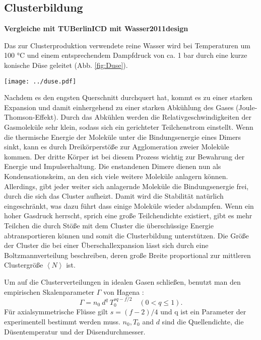 \subsection{Clusterbildung}

\textbf{Vergleiche mit TUBerlinICD mit Wasser2011design}

Das zur Clusterproduktion verwendete reine Wasser wird bei Temperaturen um 100 °C und einem entsprechendem Dampfdruck von ca. 1 bar durch eine kurze konische Düse geleitet (Abb. \ref{fig:Duse}).
%
\begin{center}
\begin{minipage}{\linewidth}
\centering
\texttt{[image: ../duse.pdf]}%
 \label{fig:Duse}
\end{minipage} 
\end{center} 

Nachdem es den engsten Querschnitt durchquert hat, kommt es zu einer starken Expansion und damit einhergehend zu einer starken Abkühlung des Gases (Joule-Thomson-Effekt). Durch das Abkühlen werden die Relativgeschwindigkeiten der Gasmoleküle sehr klein, sodass sich ein gerichteter Teilchenstrom einstellt. Wenn die thermische Energie der Moleküle unter die Bindungsenergie eines Dimers sinkt, kann es durch Dreikörperstöße zur Agglomeration zweier Moleküle kommen. Der dritte Körper ist bei diesem Prozess wichtig zur Bewahrung der Energie und Impulserhaltung. Die enstandenen Dimere dienen nun als Kondensationskeim, an den sich viele weitere Moleküle anlagern können. Allerdings, gibt jeder weiter sich anlagernde Moleküle die Bindungsenergie frei, durch die sich das Cluster aufheizt. Damit wird die Stabilität natürlich eingeschränkt, was dazu führt dass einige Moleküle wieder abdampfen. Wenn ein hoher Gasdruck herrscht, sprich eine große Teilchendichte existiert, gibt es mehr Teilchen die durch Stöße mit dem Cluster die überschüssige Energie abtransportieren können und somit die Clusterbildung unterstützen.
Die Größe der Cluster die bei einer Überschallexpansion lässt sich durch eine Boltzmannverteilung beschreiben, deren große Breite proportional zur mittleren Clustergröße $\left\langle N \right\rangle$ ist. 

Um auf die Clusterverteilungen in idealen Gasen schließen, benutzt man den empirischen Skalenparameter $\Gamma$ von Hagena \cite{hagena1987}:
%
\begin{equation} \label{eq:Skalenparameter}
\Gamma = n_0\ d^q\ T_0^{sq - f/2} \quad (0 < q \leq 1).
\end{equation}
%
Für axialsymmetrische Flüsse gilt $s = (f-2)/4$ und q ist ein Parameter der experimentell bestimmt werden muss. $n_0, T_0$ and $d$ sind die Quellendichte, die Düsentemperatur und der Düsendurchmesser.

